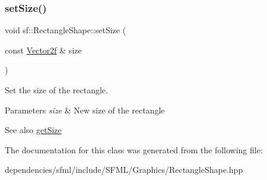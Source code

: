 \subsubsection{\texorpdfstring{set\+Size()}{setSize()}}
{\footnotesize\ttfamily void sf\+::\+Rectangle\+Shape\+::set\+Size (\begin{DoxyParamCaption}\item[{const \hyperlink{classsf_1_1_vector2}{Vector2f} \&}]{size }\end{DoxyParamCaption})}



Set the size of the rectangle. 


\begin{DoxyParams}{Parameters}
{\em size} & New size of the rectangle\\
\hline
\end{DoxyParams}
\begin{DoxySeeAlso}{See also}
\hyperlink{classsf_1_1_rectangle_shape_ae54a07ff5537bf76de6748f592b34896}{get\+Size} 
\end{DoxySeeAlso}


The documentation for this class was generated from the following file\+:\begin{DoxyCompactItemize}
\item 
dependencies/sfml/include/\+S\+F\+M\+L/\+Graphics/Rectangle\+Shape.\+hpp\end{DoxyCompactItemize}
